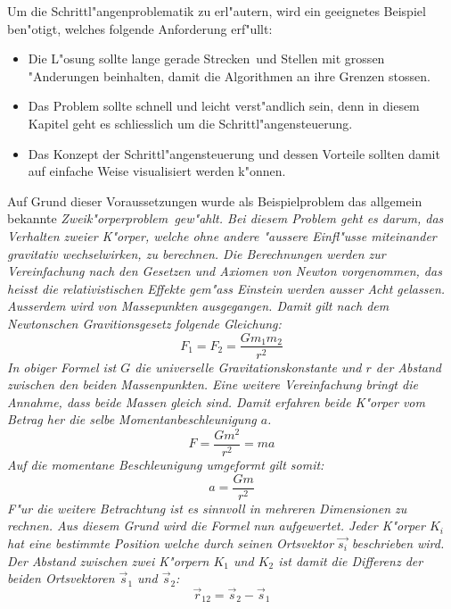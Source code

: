 \begin{refsection}
Um die Schrittl"angenproblematik zu erl"autern, wird ein geeignetes Beispiel ben"otigt, welches folgende Anforderung erf"ullt: 
\begin{itemize}
\item Die L"osung sollte \glqq lange gerade Strecken\grqq~und Stellen mit grossen "Anderungen beinhalten, damit die Algorithmen an ihre Grenzen stossen.
\item Das Problem sollte schnell und leicht verst"andlich sein, denn in diesem Kapitel geht es schliesslich um die Schrittl"angensteuerung.
\item Das Konzept der Schrittl"angensteuerung und dessen Vorteile sollten damit auf einfache Weise visualisiert werden k"onnen.
\end{itemize}
Auf Grund dieser Voraussetzungen wurde als Beispielproblem das allgemein bekannte \em Zweik"orperproblem\em~gew"ahlt.
Bei diesem Problem geht es darum, das Verhalten zweier K"orper, welche ohne andere "aussere Einfl"usse miteinander gravitativ wechselwirken, zu berechnen. 
Die Berechnungen werden zur Vereinfachung nach den Gesetzen und Axiomen von Newton vorgenommen, das heisst die relativistischen Effekte gem"ass Einstein werden ausser Acht gelassen.
Ausserdem wird von Massepunkten ausgegangen.
Damit gilt nach dem Newtonschen Gravitionsgesetz folgende Gleichung:
\begin{equation} \label{eq:newton}
F_1 = F_2=\frac{G m_1 m_2}{r^2}
\end{equation}
In obiger Formel ist $G$ die universelle Gravitationskonstante und $r$ der Abstand zwischen den beiden Massenpunkten.
Eine weitere Vereinfachung bringt die Annahme, dass beide Massen gleich sind. 
Damit erfahren beide K"orper vom Betrag her die selbe Momentanbeschleunigung $a$.
\[
F=\frac{G m^2}{r^2}=m a
\]
Auf die momentane Beschleunigung umgeformt gilt somit:
\begin{equation}
a=\frac{G m}{r^2} \label{eq:beschleunigungSkalar}
\end{equation}
F"ur die weitere Betrachtung ist es sinnvoll in mehreren Dimensionen zu rechnen.
Aus diesem Grund wird die Formel nun aufgewertet.
Jeder K"orper $K_i$ hat eine bestimmte Position welche durch seinen Ortsvektor $\vec{s_i}$ beschrieben wird.
Der Abstand zwischen zwei K"orpern $K_1$ und $K_2$ ist damit die Differenz der beiden Ortsvektoren  $\vec{s}_1$ und $\vec{s}_2$:
\begin{equation} \label{eq:abstand}
\vec{r}_{12}= \vec{s}_2-\vec{s}_1
\end{equation}

\end{refsection}
